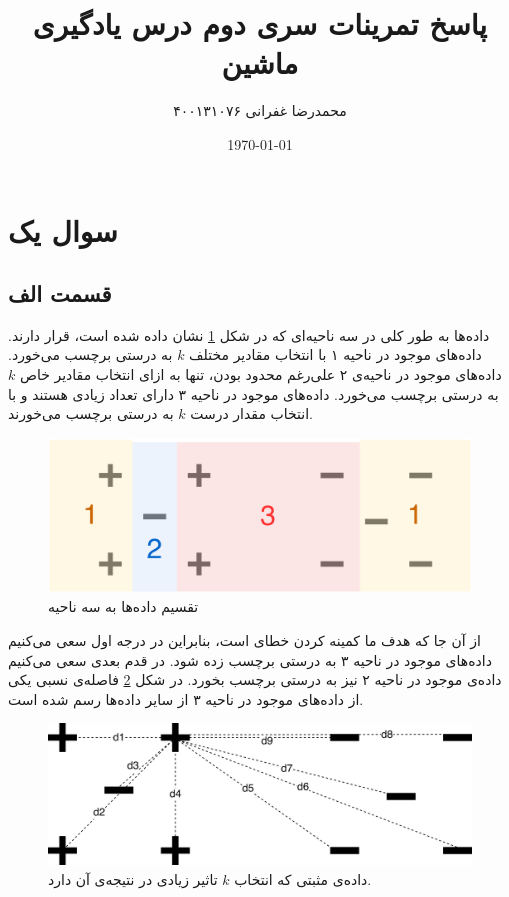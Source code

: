 \documentclass{article}
\title{\vspace{-4cm} \textbf{پاسخ تمرینات سری دوم درس یادگیری ماشین}}
\author{محمدرضا غفرانی  ۴۰۰۱۳۱۰۷۶}
\date{\today}
\begin{document}
\maketitle

\section*{سوال یک}

\subsection*{قسمت الف}

داده‌ها به طور کلی در سه ناحیه‌ای که در شکل \ref{districts-of-samples} نشان داده شده است، قرار دارند.
داده‌های موجود در ناحیه‌ ۱ با انتخاب مقادیر مختلف $k$ به درستی برچسب می‌خورد. داده‌های موجود در ناحیه‌ی
۲ علی‌رغم محدود بودن، تنها به ازای انتخاب مقادیر خاص $k$ به درستی برچسب می‌خورد. داده‌های موجود در ناحیه‌ ۳
دارای تعداد زیادی هستند و با انتخاب مقدار درست $k$ به درستی برچسب می‌خورند.

\begin{figure}[h]
    \centering
    \includegraphics[scale=0.3]{images/q1/districts.png}
    \caption{تقسیم داده‌ها به سه ناحیه}
    \label{districts-of-samples}
\end{figure}

از آن جا که هدف ما کمینه کردن خطای  است، بنابراین در درجه‌ اول سعی می‌کنیم داده‌های موجود در
ناحیه ۳ به درستی برچسب زده شود. در قدم بعدی سعی می‌کنیم داده‌ی موجود در ناحیه ۲ نیز به درستی برچسب بخورد.
در شکل \ref{distance-of-positive-data-relative-to-others} فاصله‌ی نسبی یکی از داده‌های موجود در ناحیه ۳
از سایر داده‌ها رسم شده است.

\begin{figure}[h]
    \centering
    \includegraphics[scale=0.4]{images/q1/distances.png}
    \caption{داده‌ی مثبتی که انتخاب $k$ تاثیر زیادی در نتیجه‌ی آن دارد.}
    \label{distance-of-positive-data-relative-to-others}
\end{figure}
\end{document}

